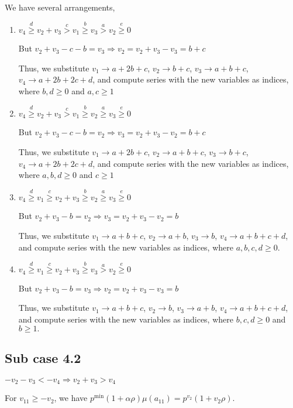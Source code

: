 \documentclass{article}
\begin{document}
We have several arrangements,
\begin{enumerate}
\item 
$v_4\overset{d}{\geq}v_2+v_3\overset{c}{>}v_1\overset{b}{\geq}{v_3}\overset{a}{>}v_2\overset{e}{\geq}{0}$

But $v_2+v_3-c-b=v_3\Rightarrow{v_2=v_2+v_3-v_3=b+c}$

Thus, we substitute $v_1\rightarrow{a+2b+c}$, $v_2\rightarrow{b+c}$, $v_3\rightarrow{a+b+c}$, $v_4\rightarrow{a+2b+2c+d}$, and compute series with the new variables as indices, where $b,d\geq{0}$ and $a,c\geq{1}$

\item 
$v_4\overset{d}{\geq}v_2+v_3\overset{c}{>}v_1\overset{b}{\geq}{v_2}\overset{a}{\geq}v_3\overset{e}{\geq}{0}$

But $v_2+v_3-c-b=v_2\Rightarrow{v_3=v_2+v_3-v_2=b+c}$

Thus, we substitute $v_1\rightarrow{a+2b+c}$, $v_2\rightarrow{a+b+c}$, $v_3\rightarrow{b+c}$, $v_4\rightarrow{a+2b+2c+d}$, and compute series with the new variables as indices, where $a,b,d\geq{0}$ and $c\geq{1}$

\item 
$v_4\overset{d}{\geq}v_1\overset{c}{\geq}v_2+v_3\overset{b}{\geq}{v_2}\overset{a}{\geq}v_3\overset{e}{\geq}{0}$

But $v_2+v_3-b=v_2\Rightarrow{v_3=v_2+v_3-v_2=b}$

Thus, we substitute $v_1\rightarrow{a+b+c}$, $v_2\rightarrow{a+b}$, $v_3\rightarrow{b}$, $v_4\rightarrow{a+b+c+d}$, and compute series with the new variables as indices, where $a,b,c,d\geq{0}.$

\item 
$v_4\overset{d}{\geq}v_1\overset{c}{\geq}v_2+v_3\overset{b}{\geq}{v_3}\overset{a}{>}v_2\overset{e}{\geq}{0}$

But $v_2+v_3-b=v_3\Rightarrow{v_2=v_2+v_3-v_3=b}$

Thus, we substitute $v_1\rightarrow{a+b+c}$, $v_2\rightarrow{b}$, $v_3\rightarrow{a+b}$, $v_4\rightarrow{a+b+c+d}$, and compute series with the new variables as indices, where $b,c,d\geq{0}$ and $b\geq{1}.$

\end{enumerate}
\subsection{Sub case 4.2}
$-v_2-v_3<{-v_4}\Rightarrow{v_2+v_3>{v_4}}$

For $v_{11}\geq{-v_2}$, we have $p^{\min}(1+\alpha\rho)\mu(a_{11})=p^{v_2}(1+v_2\rho).$
\end{document}
